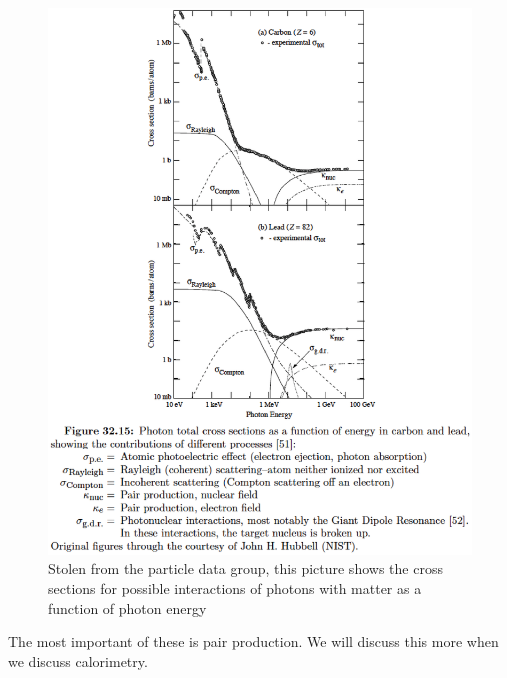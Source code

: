 \begin{figure}[h]
\centering\includegraphics[scale=0.5]{./particleinteractions/Pictures/photoninteractions.eps}
\caption{Stolen from the particle data group, this picture shows the cross sections for possible interactions of photons with matter as a function of photon energy }
\label{fig:photoninteractions}
\end{figure}



The most important of these is pair production.  We will discuss this more when we discuss calorimetry.

